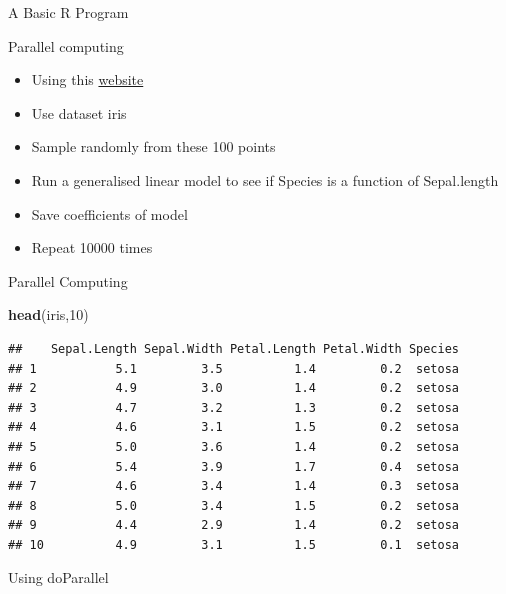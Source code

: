 \documentclass[ignorenonframetext,]{beamer}
\newenvironment{Shaded}{\begin{snugshade}}{\end{snugshade}}
\newcommand{\KeywordTok}[1]{\textcolor[rgb]{0.13,0.29,0.53}{\textbf{#1}}}
\newcommand{\DecValTok}[1]{\textcolor[rgb]{0.00,0.00,0.81}{#1}}
\newcommand{\NormalTok}[1]{#1}
\providecommand{\tightlist}{%
  \setlength{\itemsep}{0pt}\setlength{\parskip}{0pt}}
\begin{document}
\begin{frame}[fragile]{A Basic R Program}

\begin{block}{Parallel computing}

\begin{itemize}[<+->]
\tightlist
\item
  Using this
  \href{https://nceas.github.io/oss-lessons/parallel-computing-in-r/parallel-computing-in-r.html}{website}
\item
  Use dataset iris
\item
  Sample randomly from these 100 points
\item
  Run a generalised linear model to see if Species is a function of
  Sepal.length
\item
  Save coefficients of model
\item
  Repeat 10000 times
\end{itemize}

\end{block}

\begin{block}{Parallel Computing}

\begin{Shaded}
\begin{Highlighting}[]
\KeywordTok{head}\NormalTok{(iris,}\DecValTok{10}\NormalTok{)}
\end{Highlighting}
\end{Shaded}

\begin{verbatim}
##    Sepal.Length Sepal.Width Petal.Length Petal.Width Species
## 1           5.1         3.5          1.4         0.2  setosa
## 2           4.9         3.0          1.4         0.2  setosa
## 3           4.7         3.2          1.3         0.2  setosa
## 4           4.6         3.1          1.5         0.2  setosa
## 5           5.0         3.6          1.4         0.2  setosa
## 6           5.4         3.9          1.7         0.4  setosa
## 7           4.6         3.4          1.4         0.3  setosa
## 8           5.0         3.4          1.5         0.2  setosa
## 9           4.4         2.9          1.4         0.2  setosa
## 10          4.9         3.1          1.5         0.1  setosa
\end{verbatim}

\end{block}

\begin{block}{Using doParallel}


\end{block}
\end{frame}
\end{document}
